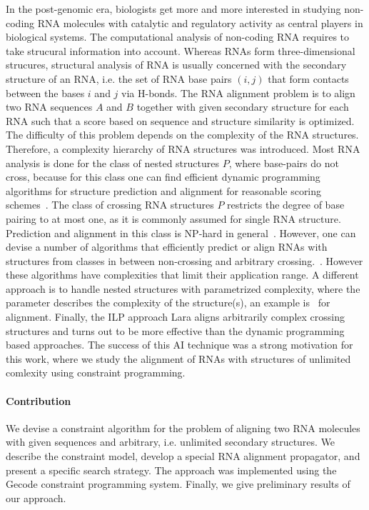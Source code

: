 \documentclass[11pt]{llncs}
\begin{document}
In the post-genomic era, biologists get more and more interested in
studying non-coding RNA molecules with catalytic and regulatory
activity as central players in biological systems. 
%
The computational analysis of non-coding RNA requires to take
strucural information into account.
%
Whereas RNAs form three-dimensional strucures, structural analysis of
RNA is usually concerned with the secondary structure of an RNA, i.e.
the set of RNA base pairs $(i,j)$ that form contacts between the bases
$i$ and $j$ via H-bonds. The RNA alignment problem is to align two RNA
sequences $A$ and $B$ together with given secondary structure for each
RNA such that a score based on sequence and structure similarity is
optimized. The difficulty of this problem depends on the complexity of
the RNA structures. Therefore, a complexity hierarchy of RNA
structures was introduced. Most RNA analysis is done for the class of
nested structures $P$, where base-pairs do not cross, because for this
class one can find efficient dynamic programming algorithms for
structure prediction and alignment for reasonable scoring
schemes~\cite{Zuker,Jiang}. The class of crossing RNA structures $P$
restricts the degree of base pairing to at most one, as it is commonly
assumed for single RNA structure. Prediction and alignment in this
class is NP-hard in general~\cite{...}. However, one can devise a
number of algorithms that efficiently predict or align RNAs with
structures from classes in between non-crossing and arbitrary
crossing.~\cite{PK,structure,prediction,Moehl:Lifting}. However these
algorithms have complexities that limit their application range. A
different approach is to handle nested structures with parametrized
complexity, where the parameter describes the complexity of the
structure(s), an example is~\cite{Moehl:CPM} for alignment.  Finally,
the ILP approach Lara aligns arbitrarily complex crossing structures
and turns out to be more effective than the dynamic programming based
approaches. The success of this AI technique was a strong motivation
for this work, where we study the alignment of RNAs with structures of
unlimited comlexity using constraint programming.
\paragraph{Contribution} We devise a constraint algorithm for the
problem of aligning two RNA molecules with given sequences and
arbitrary, i.e. unlimited secondary structures. We describe the
constraint model, develop a special RNA alignment propagator, and
present a specific search strategy. The approach was implemented using
the Gecode constraint programming system. Finally, we give preliminary
results of our approach.
\end{document}
